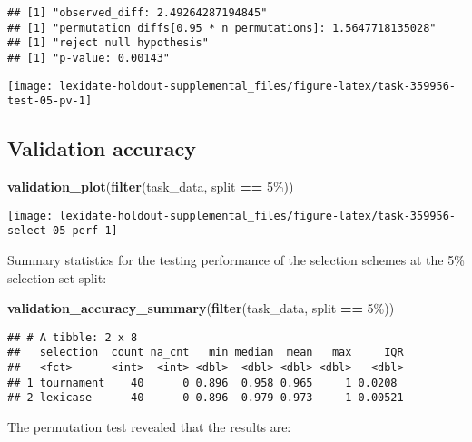 \documentclass[
]{book}
\newenvironment{Shaded}{\begin{snugshade}}{\end{snugshade}}
\newcommand{\FunctionTok}[1]{\textcolor[rgb]{0.13,0.29,0.53}{\textbf{#1}}}
\newcommand{\NormalTok}[1]{#1}
\newcommand{\SpecialCharTok}[1]{\textcolor[rgb]{0.81,0.36,0.00}{\textbf{#1}}}
\newcommand{\StringTok}[1]{\textcolor[rgb]{0.31,0.60,0.02}{#1}}
\begin{document}
\begin{verbatim}
## [1] "observed_diff: 2.49264287194845"
## [1] "permutation_diffs[0.95 * n_permutations]: 1.5647718135028"
## [1] "reject null hypothesis"
## [1] "p-value: 0.00143"
\end{verbatim}

\texttt{[image: lexidate-holdout-supplemental\_files/figure-latex/task-359956-test-05-pv-1]}

\hypertarget{validation-accuracy-25}{%
\subsection{Validation accuracy}\label{validation-accuracy-25}}

\begin{Shaded}
\begin{Highlighting}[]
\FunctionTok{validation\_plot}\NormalTok{(}\FunctionTok{filter}\NormalTok{(task\_data, split }\SpecialCharTok{==} \StringTok{\textquotesingle{}5\%\textquotesingle{}}\NormalTok{))}
\end{Highlighting}
\end{Shaded}

\texttt{[image: lexidate-holdout-supplemental\_files/figure-latex/task-359956-select-05-perf-1]}

Summary statistics for the testing performance of the selection schemes at the 5\% selection set split:

\begin{Shaded}
\begin{Highlighting}[]
\FunctionTok{validation\_accuracy\_summary}\NormalTok{(}\FunctionTok{filter}\NormalTok{(task\_data, split }\SpecialCharTok{==} \StringTok{\textquotesingle{}5\%\textquotesingle{}}\NormalTok{))}
\end{Highlighting}
\end{Shaded}

\begin{verbatim}
## # A tibble: 2 x 8
##   selection  count na_cnt   min median  mean   max     IQR
##   <fct>      <int>  <int> <dbl>  <dbl> <dbl> <dbl>   <dbl>
## 1 tournament    40      0 0.896  0.958 0.965     1 0.0208 
## 2 lexicase      40      0 0.896  0.979 0.973     1 0.00521
\end{verbatim}

The permutation test revealed that the results are:
\end{document}
